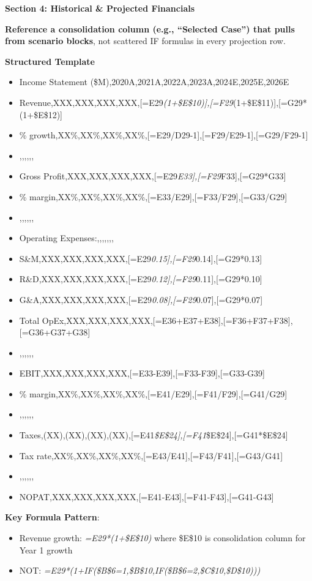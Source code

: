\documentclass[11pt]{article}
\begin{document}
\textbf{Section 4: Historical \& Projected Financials}


\textbf{Reference a consolidation column (e.g., ``Selected Case'') that pulls from scenario blocks}, not scattered IF formulas in every projection row.


\textbf{Structured Template}
\begin{itemize}[leftmargin=*,itemsep=2pt,topsep=2pt]
\item {} Income Statement (\$M),2020A,2021A,2022A,2023A,2024E,2025E,2026E
\item {} Revenue,XXX,XXX,XXX,XXX,[=E29\emph{(1+\$E\$10)],[=F29}(1+\$E\$11)],[=G29*(1+\$E\$12)]
\item {} \% growth,XX\%,XX\%,XX\%,XX\%,[=E29/D29-1],[=F29/E29-1],[=G29/F29-1]
\item {} ,,,,,,
\item {} Gross Profit,XXX,XXX,XXX,XXX,[=E29\emph{E33],[=F29}F33],[=G29*G33]
\item {} \% margin,XX\%,XX\%,XX\%,XX\%,[=E33/E29],[=F33/F29],[=G33/G29]
\item {} ,,,,,,
\item {} Operating Expenses:,,,,,,,
\item {} S\&M,XXX,XXX,XXX,XXX,[=E29\emph{0.15],[=F29}0.14],[=G29*0.13]
\item {} R\&D,XXX,XXX,XXX,XXX,[=E29\emph{0.12],[=F29}0.11],[=G29*0.10]
\item {} G\&A,XXX,XXX,XXX,XXX,[=E29\emph{0.08],[=F29}0.07],[=G29*0.07]
\item {} Total OpEx,XXX,XXX,XXX,XXX,[=E36+E37+E38],[=F36+F37+F38],[=G36+G37+G38]
\item {} ,,,,,,
\item {} EBIT,XXX,XXX,XXX,XXX,[=E33-E39],[=F33-F39],[=G33-G39]
\item {} \% margin,XX\%,XX\%,XX\%,XX\%,[=E41/E29],[=F41/F29],[=G41/G29]
\item {} ,,,,,,
\item {} Taxes,(XX),(XX),(XX),(XX),[=E41\emph{\$E\$24],[=F41}\$E\$24],[=G41*\$E\$24]
\item {} Tax rate,XX\%,XX\%,XX\%,XX\%,[=E43/E41],[=F43/F41],[=G43/G41]
\item {} ,,,,,,
\item {} NOPAT,XXX,XXX,XXX,XXX,[=E41-E43],[=F41-F43],[=G41-G43]
\end{itemize}

\textbf{Key Formula Pattern}:

\begin{itemize}[leftmargin=*,itemsep=2pt,topsep=2pt]
\item {} Revenue growth: \emph{=E29*(1+\$E\$10)} where \$E\$10 is consolidation column for Year 1 growth
\item {} NOT: \emph{=E29*(1+IF(\$B\$6=1,\$B\$10,IF(\$B\$6=2,\$C\$10,\$D\$10)))}
\end{itemize}
\end{document}
